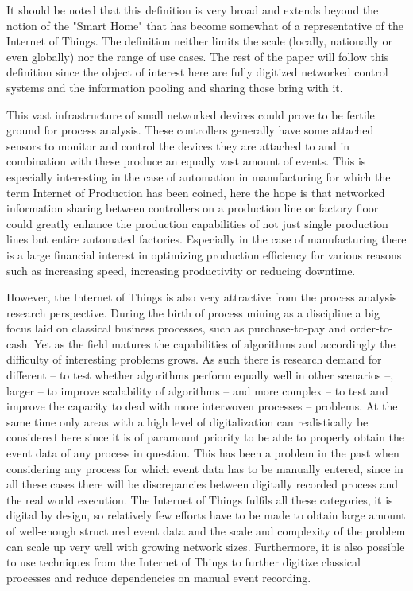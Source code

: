 \documentclass[runningheads]{template/llncs}
\begin{document}
It should be noted that this definition is very broad and extends beyond the notion of the "Smart Home" that has become somewhat of a representative of the Internet of Things.
The definition neither limits the scale (locally, nationally or even globally) nor the range of use cases.
The rest of the paper will follow this definition since the object of interest here are fully digitized networked control systems and the information pooling and sharing those bring with it.


This vast infrastructure of small networked devices could prove to be fertile ground for process analysis.
These controllers generally have some attached sensors to monitor and control the devices they are attached to and in combination with these produce an equally vast amount of events.
This is especially interesting in the case of automation in manufacturing\cite{JKM*20} for which the term Internet of Production has been coined, here the hope is that networked information sharing between controllers on a production line or factory floor could greatly enhance the production capabilities of not just single production lines but entire automated factories.
Especially in the case of manufacturing there is a large financial interest in optimizing production efficiency for various reasons such as increasing speed, increasing productivity or reducing downtime.

However, the Internet of Things is also very attractive from the process analysis research perspective.
During the birth of process mining as a discipline a big focus laid on classical business processes, such as purchase-to-pay and order-to-cash.
Yet as the field matures the capabilities of algorithms and accordingly the difficulty of interesting problems grows.
As such there is research demand \cite{JKM*20} for different -- to test whether algorithms perform equally well in other scenarios --, larger -- to improve scalability of algorithms -- and more complex -- to test and improve the capacity to deal with more interwoven processes -- problems.
At the same time only areas with a high level of digitalization can realistically be considered here since it is of paramount priority to be able to properly obtain the event data of any process in question.
This has been a problem in the past when considering any process for which event data has to be manually entered, since in all these cases there will be discrepancies between digitally recorded process and the real world execution.
The Internet of Things fulfils all these categories, it is digital by design, so relatively few efforts have to be made to obtain large amount of well-enough structured event data and the scale and complexity of the problem can scale up very well with growing network sizes. 
Furthermore, it is also possible to use techniques from the Internet of Things to further digitize classical processes and reduce dependencies on manual event recording.
\end{document}

